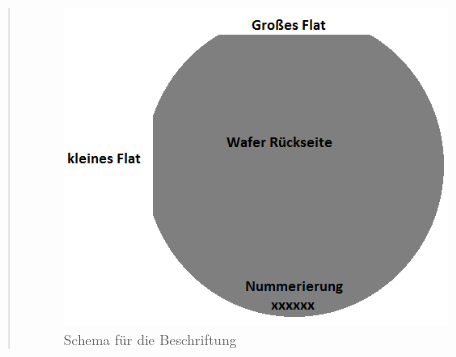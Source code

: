 \begin{quote}
			\begin{figure}[H]
				\hspace{2.0cm}
                \includegraphics[scale=0.8, trim = 0cm 0cm 0cm 0cm,clip]
                	{./HerstellungBilder/WafRueckseite.png}
                  \caption{Schema für die Beschriftung}
                \label{fig:WafRueckseite}
            \end{figure}

            \vspace{2em}


\end{quote}
